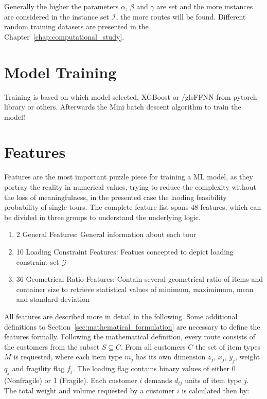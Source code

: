 Generally the higher the parameters $\alpha$, $\beta$ and $\gamma$ are set and the more instances
are considered in the instance set $\mathcal{I}$, the more routes will be found. Different
random training datasets are presented in the Chapter~\ref{chap:computational_study}.

\section{Model Training}
\label{sec:ModelTraining}

Training is based on which model selected, XGBoost or /gls{FFNN} from pytorch library or others. Afterwards the Mini batch descent
algorithm to train the model!

\section{Features}
\label{sec:Features}

Features are the most important puzzle piece for training a \gls{ML} model, as they portray the reality in numerical values, trying to
reduce the complexity without the loss of meaningfulness, in the presented case the laoding feasibility probability of single tours.
The complete feature list spans 48 features, which can be divided in three groups to understand the underlying logic.

\begin{enumerate}
    \item 2 General Features: General information about each tour
    \item 10 Loading Constraint Features: Featues concepted to depict loading constraint set $\mathcal{G}$
    \item 36 Geometrical Ratio Features: Contain several geometrical ratio of items and container size to retrieve
          statistical values of minimum, maximimum, mean and standard deviation
\end{enumerate}

All features are described more in detail in the following. Some additional definitions to Section~\ref{sec:mathematical_formulation}
are necessary to define the features formally. Following the mathematical definition, every route consists of the customers
from the subset $S \subseteq C$. From all customers $C$ the set of item types $M$ is requested, where each item type $m_j$ has its own
dimension {$z_j$, $x_j$, $y_j$}, weight $q_j$ and fragility flag $f_j$. The loading flag contains binary values of either 0 (Nonfragile)
or 1 (Fragile). Each customer $i$ demands $d_{ij}$ units of item type $j$.
The total weight and volume requested by a customer $i$ is calculated then by:

